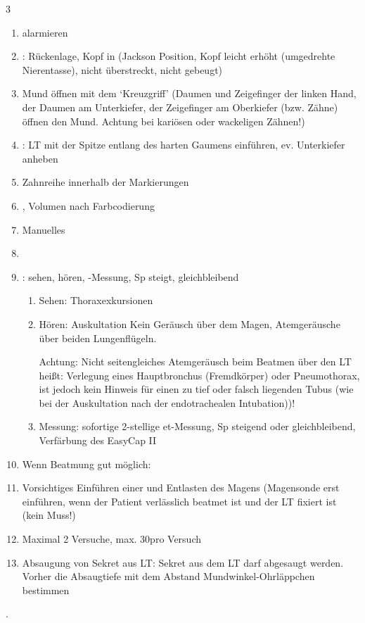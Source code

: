 \documentclass[
ngerman,
paper=a4,
asymmetric,
fontsize=10pt,
draft=false,
numbers=noenddot,
bibtotocnumbered,
footnotes=multiple,
]{scrreprt}
\newcommand{\jALT}{\vspace{6pt}\noindent{\color{red}\sffamily\textbf{DELETED}\hrulefill\newline}}
\newcommand{\jALTende}{\newline{\color{red}\rule{\linewidth}{2pt}\newline}}
\begin{document}
 \jALT
\begin{WidePar}
\begin{multicols}{3}
 \begin{enumerate}\CorrectionListsBox
  \item {} alarmieren
   \item {}: Rückenlage, Kopf in
    (Jackson Position, Kopf
   leicht erhöht (umgedrehte Nierentasse), nicht überstreckt,
   nicht gebeugt)
   \item Mund öffnen mit dem
   \enquote*{Kreuzgriff} (Daumen und Zeigefinger der linken
   Hand, der Daumen am Unterkiefer, der Zeigefinger am
   Oberkiefer (bzw. Zähne) öffnen den Mund. Achtung bei
   kariösen oder wackeligen Zähnen!)
   \item {}: LT mit der Spitze
   entlang des harten Gaumens einführen, ev. Unterkiefer
   anheben
   \item Zahnreihe innerhalb der Markierungen
   \item
   , Volumen nach Farbcodierung
   \item Manuelles
   \item {}
   \item {}: sehen,
   hören, -Messung, Sp steigt, gleichbleibend
   \begin{enumerate}
     \item Sehen: Thoraxexkursionen
    \item Hören: Auskultation
    Kein Geräusch über dem
    Magen, Atemgeräusche über beiden Lungenflügeln.

    Achtung: Nicht seitengleiches Atemgeräusch beim
    Beatmen über den LT heißt: Verlegung eines Hauptbronchus
    (Fremdkörper) oder Pneumothorax, ist jedoch kein
    Hinweis für einen zu tief oder falsch liegenden Tubus
    (wie bei der Auskultation nach der endotrachealen
    Intubation))!
    \item Messung: sofortige 2-stellige et-Messung,
     Sp steigend oder gleichbleibend, Verfärbung des EasyCap
     II
   \end{enumerate}
   \item Wenn Beatmung gut möglich: 
   \item Vorsichtiges Einführen einer  und Entlasten des
   Magens (Magensonde erst einführen, wenn der Patient
   verlässlich beatmet ist und der LT fixiert ist (kein Muss!)
   \item Maximal 2 Versuche, max. 30\Sec* pro Versuch
   \item Absaugung von Sekret aus LT: Sekret aus dem LT  darf
   abgesaugt werden. Vorher die Absaugtiefe mit dem Abstand
   Mundwinkel-Ohrläppchen bestimmen
 \end{enumerate}
\end{multicols}
\end{WidePar}
 .
 \jALTende
\end{document}
